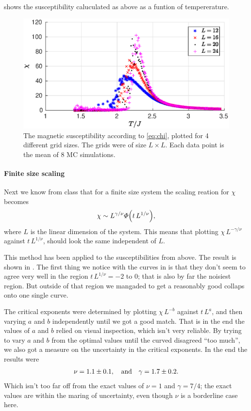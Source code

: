 \documentclass[11pt,letter, swedish, english
]{article}
\begin{document}
 shows the susceptibility caluculated as above as a
funtion of tempererature. 


\begin{figure}
\centering
\includegraphics[width=.7\textwidth]{chi_L-16--24_Nsteps-2048_Nmean-16.eps}
\caption{The magnetic susceptibility according to \eqref{eq:chi},
  plotted for 4 different grid sizes. The grids were of size 
  $L\times L$. Each data point is the mean of 8 MC simulations.}
\label{fig:chi1}
\end{figure}

\paragraph{Finite size scaling}
Next we know from class that for a finite size system the scaling
reation for $\chi$ becomes
\begin{equation}
\chi\sim L^{\gamma/\nu}\varPhi\qty(t\,L^{1/\nu}),
\end{equation}
where $L$ is the linear dimension of the system. This means that
plotting $\chi\,L^{-\gamma/\nu}$ against $t\,L^{1/\nu}$, should look
the same independent of $L$. 

This method has been applied to the susceptibilities from above. The
result is shown in . The first thing we
notice with the curves in  is that they
don't seem to agree very well in the region $t\,L^{1/\nu}=-2$ to $0$;
that is also by far the noisiest region. But outside of that region we
mangaded to get a reasonably good collaps onto one single curve. 

The critical exponents were determined by plotting $\chi\,L^{-b}$ 
against $t\,L^{a}$, and then varying $a$ and $b$ independently until
we got a good match. That is in the end the values of $a$ and $b$
relied on visual inspection, which isn't very reliable. By trying to
vary $a$ and $b$ from the optimal values until the curved disagreed
``too much'', we also got a measure on the uncertainty in the critical
exponents. In the end the results were
\begin{equation*}
\nu = 1.1\pm0.1\qcomma\text{and} \quad
\gamma = 1.7\pm0.2.
\end{equation*}
Which isn't too far off from the exact values of $\nu=1$ and
$\gamma=7/4$; the exact values are within the maring of uncertainty,
even though $\nu$ is a borderline case here. 
\end{document}
